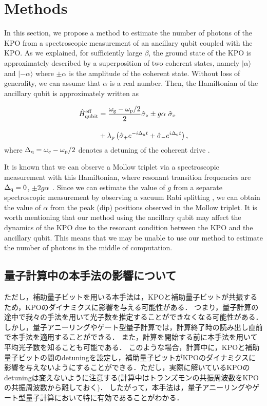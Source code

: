 \section{Methods}
In this section, we propose a method to estimate the number of photons of the KPO from a spectroscopic measurement of an ancillary qubit coupled with the KPO. As we explained,
for sufficiently large $\beta$, the ground state of the KPO is approximately described by a superposition of two coherent states, namely $|\alpha\rangle$ and $|-\alpha\rangle$ where $\pm \alpha$ is the amplitude of the coherent state. Without loss of generality, we can assume that $\alpha$ is a real number. Then, the Hamiltonian of the ancillary qubit is approximately written as

\begin{align}\label{qubit_Hamiltonian}
    \hat{H}_{\rm{qubit}}^{\rm{eff}}
    &=\frac{\omega_{\rm{g}}-\omega_{\rm{p}}/2}{2}\hat{\sigma}_z
    \pm 
    g\alpha\ \hat{\sigma}_x\nn[10pt]
    &+\lambda_{\rm{p}}\left(\hat{\sigma}_+ e^{-i\Delta _{\rm{q}}t}+\hat{\sigma}_- e^{i\Delta _{\rm{q}}t}\right),
\end{align}
where $\Delta _{\rm{q}}=\omega_c-\omega_{\rm{p}}/2$ denotes a detuning of the coherent drive
\cite{goto2016bifurcation}.


It is known that we can observe a Mollow triplet via a spectroscopic measurement with this Hamiltonian, where resonant transition frequencies are 
$\Delta _{\rm{q}}=0$, $\pm 2g\alpha$~\cite{Mollow:1969zz,wu1994phase,wrigge2008efficient,ulhaq2012cascaded,xu2007coherent,laucht2017dressed}.
Since we can estimate the value of $g$ from a separate spectroscopic measurement by observing a vacuum Rabi splitting \cite{wallraff2004strong,chiorescu2004coherent}, 
we can obtain the value of $\alpha$ from the peak (dip) positions observed in the Mollow triplet.
It is worth mentioning that our method using the ancillary qubit
may affect the dynamics of the KPO due to the resonant condition between the KPO and the ancillary qubit. This means that 
we may be unable to use our method to estimate the number of photons in the middle of computation. 


\subsection{量子計算中の本手法の影響について}
ただし，補助量子ビットを用いる本手法は，KPOと補助量子ビットが共振するため，KPOのダイナミクスに影響を与える可能性がある．
つまり，量子計算の途中で我々の手法を用いて光子数を推定することができなくなる可能性がある．  
しかし，量子アニーリングやゲート型量子計算では，計算終了時の読み出し直前で本手法を適用することができる．
また，計算を開始する前に本手法を用いて平均光子数を知ることも可能である．
このような場合，計算中に，KPOと補助量子ビットの間のdetuningを設定し，補助量子ビットがKPOのダイナミクスに影響を与えないようにすることができる．ただし，実際に解いているKPOのdetuningは変えないように注意する(計算中はトランズモンの共振周波数をKPOの共振周波数から離しておく)．
したがって，本手法は，量子アニーリングやゲート型量子計算において特に有効であることがわかる．

